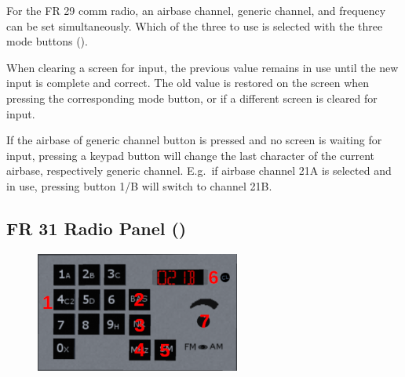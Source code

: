 \documentclass[a4paper]{report}
\begin{document}
{  For the FR 29 comm radio, an airbase channel, generic channel, and frequency can be set simultaneously.
  Which of the three to use is selected with the three mode buttons
  ().

  When clearing a screen for input, the previous value remains in use until the new input is complete and correct.
  The old value is restored on the screen when pressing the corresponding mode button,
  or if a different screen is cleared for input.

  If the airbase of generic channel button is pressed and no screen is waiting for input,
  pressing a keypad button will change the last character of the current airbase,
  respectively generic channel.
  E.g.\ if airbase channel 21A is selected and in use, pressing button 1/B will switch to channel 21B.

  \subsection{FR 31 Radio Panel ()}
  \begin{figure}[h]
    \centering
    \includegraphics[width=0.6\textwidth]{images/controls/fr31.png}


\end{figure}}
\end{document}
